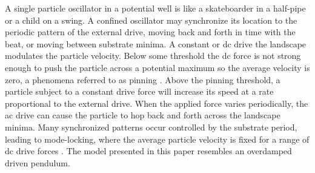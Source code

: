 \documentclass[twocolumn,preprintnumbers,amsmath,amssymb,aps,prx]{revtex4}
\begin{document}
A single particle oscillator
in a potential well is 
like a skateboarder in a half-pipe or
a child on a swing.
 A confined oscillator may 
 synchronize its location
 to the periodic pattern of the external drive,
 moving back and forth in time with
 the beat,
 or moving between substrate minima.
 A constant or 
 dc drive the landscape modulates 
 the particle velocity.
 Below some threshold  
 the dc force is not strong enough to push the particle
 across a potential maximum so the average velocity is zero,
 a phenomena referred to as pinning \cite{Reichhardt2017}.
 Above the pinning threshold,
 a particle subject to a constant
 drive force will increase its speed at a rate proportional
 to the external drive.  
 When the applied force varies periodically,
 the ac drive can 
 cause the particle to hop back and forth across
 the landscape minima.
 Many synchronized patterns occur
 controlled by the substrate period,
 leading to 
 mode-locking,
 where the average particle velocity
 is fixed for a range of dc drive forces \cite{Reichhardt2015}.
 The model presented in this paper
 resembles an overdamped driven pendulum. 
\end{document}
